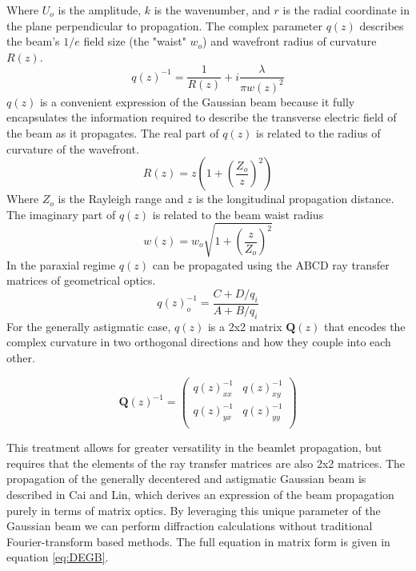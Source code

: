Where $U_o$ is the amplitude, $k$ is the wavenumber, and $r$ is the radial coordinate in the plane perpendicular to propagation. The complex parameter $q(z)$ describes the beam's $1/e$ field size (the "waist" $w_o$) and wavefront radius of curvature $R(z)$. 
\begin{equation}
	q(z)^{-1} = \frac{1}{R(z)}+i\frac{\lambda}{\pi w(z)^2}
\end{equation}	
$q(z)$ is a convenient expression of the Gaussian beam because it fully encapsulates the information required to describe the transverse electric field of the beam as it propagates. The real part of $q(z)$ is related to the radius of curvature of the wavefront.
\begin{equation}
	R(z) = z(1+(\frac{Z_o}{z})^2)
\end{equation}
Where $Z_o$ is the Rayleigh range and $z$ is the longitudinal propagation distance.
The imaginary part of $q(z)$ is related to the beam waist radius
\begin{equation}
	w(z) = w_o\sqrt{1+(\frac{z}{Z_o})^2}
\end{equation}
In the paraxial regime $q(z)$ can be propagated using the ABCD ray transfer matrices of geometrical optics.
\begin{equation}
    q(z)^{-1}_{o} = \frac{C + D/q_{i}}{A + B/q_{i}}
\end{equation}
For the generally astigmatic case, $q(z)$ is a 2x2 matrix $\textbf{Q}(z)$ that encodes the complex curvature in two orthogonal directions and how they couple into each other\cite{Ashcraft2020,cai_decentered_nodate}. 

\begin{equation}
    \textbf{Q}(z)^{-1} = 
    \begin{pmatrix}
    q(z)_{xx}^{-1} & q(z)_{xy}^{-1} \\
    q(z)_{yx}^{-1} & q(z)_{yy}^{-1} \\
    \end{pmatrix}
\end{equation}

This treatment allows for greater versatility in the beamlet propagation, but requires that the elements of the ray transfer matrices are also 2x2 matrices. The propagation of the generally decentered and astigmatic Gaussian beam is described in Cai and Lin\cite{cai_decentered_nodate}, which derives an expression of the beam propagation purely in terms of matrix optics. By leveraging this unique parameter of the Gaussian beam we can perform diffraction calculations without traditional Fourier-transform based methods. The full equation in matrix form is given in equation \ref{eq:DEGB}.

